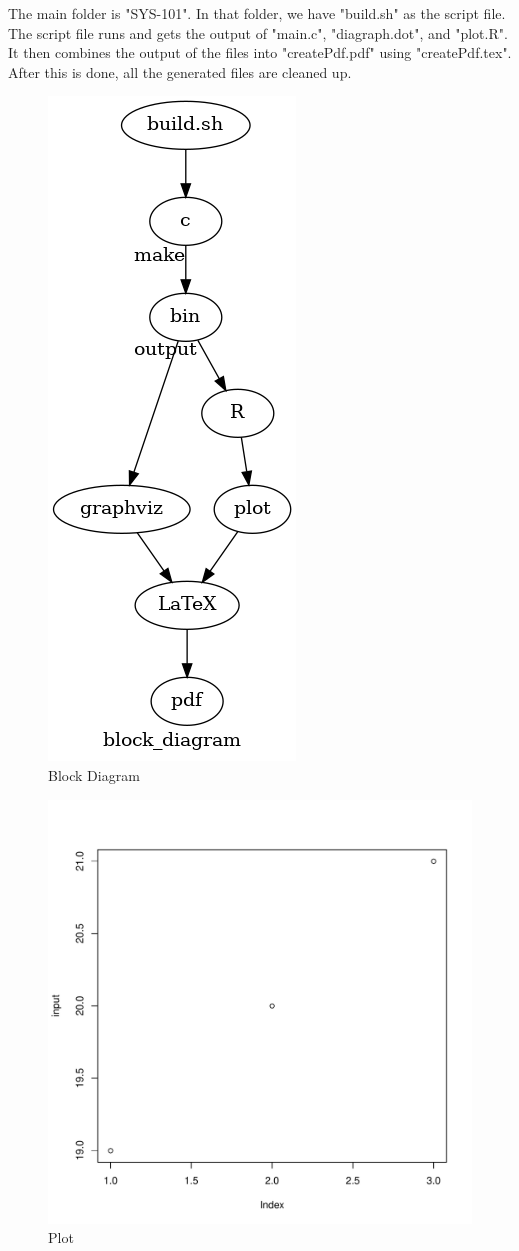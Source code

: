 \documentclass[12pt]{report}
\begin{document}
The main folder is "SYS-101". In that folder, we have "build.sh" as the script file. The script file runs and gets the output of "main.c", "diagraph.dot", and "plot.R". It then combines the output of the files into "createPdf.pdf" using "createPdf.tex". After this is done, all the generated files are cleaned up.

\begin{figure}[h]
\centering
\caption{Block Diagram}
\includegraphics[height = 0.7\textheight]{image.png}
\end{figure}

\begin{figure}[h]
\centering
\caption{Plot}
\includegraphics[height = 0.8\textheight]{Rplots.pdf}
\end{figure}
\end{document}
